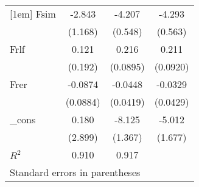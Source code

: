 \begin{tabular}{l*{3}{c}}
[1em]
Fsim        &      -2.843&      -4.207&      -4.293\\
            &     (1.168)&     (0.548)&     (0.563)\\
[1em]
Frlf        &       0.121&       0.216&       0.211\\
            &     (0.192)&    (0.0895)&    (0.0920)\\
[1em]
Frer        &     -0.0874&     -0.0448&     -0.0329\\
            &    (0.0884)&    (0.0419)&    (0.0429)\\
[1em]
\_cons      &       0.180&      -8.125&      -5.012\\
            &     (2.899)&     (1.367)&     (1.677)\\
\hline
\(R^{2}\)   &       0.910&       0.917&            \\
\hline\hline
\multicolumn{4}{l}{\footnotesize Standard errors in parentheses}\\
\end{tabular}
